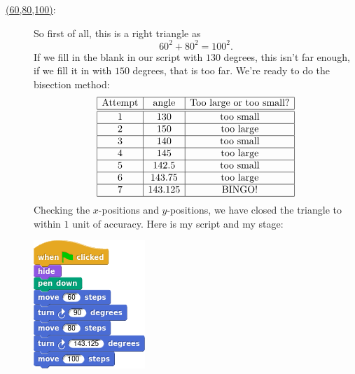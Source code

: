 \documentclass[noauthor,nooutcomes,12pt]{ximera}
\begin{document}
\begin{question}
\begin{freeResponse}
\begin{description}
      \item[\underline{(60,80,100)}:] So first of all, this is a right
        triangle as
        \[
        60^2 + 80^2 = 100^2.
        \]
        If we fill in the blank in our script with $130$ degrees, this
        isn't far enough, if we fill it in with $150$ degrees, that is
        too far. We're ready to do the bisection method:
        \[
        \begin{array}{|c|c|c|c|}\hline
          \text{Attempt} & \text{angle} & \text{Too large or too small?} \\ \hline\hline
          1 & 130 & \text{too small} \\ \hline
          2 & 150 & \text{too large}  \\ \hline
          3 & 140 & \text{too small}  \\ \hline
          4 & 145 & \text{too large}  \\ \hline
          5 & 142.5 & \text{too small}  \\ \hline
          6 & 143.75 & \text{too large}  \\ \hline
          7 & 143.125 & \text{BINGO!}  \\ \hline
        \end{array}
        \]
        Checking the $x$-positions and $y$-positions, we have closed
        the triangle to within $1$ unit of accuracy. Here is my script and my stage:
        \begin{center}
          \includegraphics[width=.3\textwidth]{6080100-script.png}   \qquad {}
        \end{center}
    \end{description}
  \end{freeResponse}
\end{question}
\mynewpage
\end{document}
